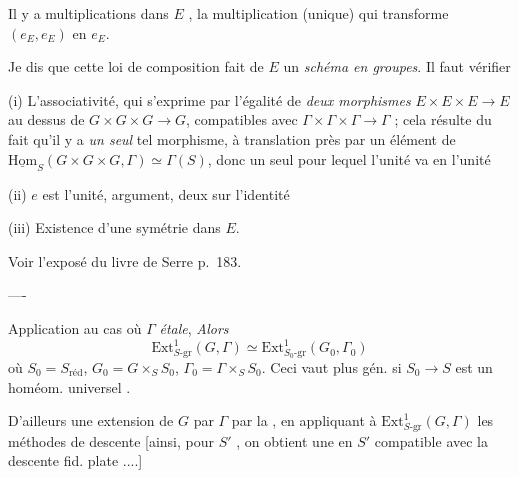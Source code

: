 \documentclass[11pt,a4paper]{article}
\begin{document}
Il y a \ill{} multiplications  dans $E$
\ill{} \ill{} \ill{} \ill{} \ill{} \ill{}, \ill{} la multiplication
\struck{\ill{}} (unique) qui transforme $(e_E, e_E)$ en $e_E$.


Je dis que cette loi de composition fait de $E$ un \emph{schéma en
groupes}. Il faut vérifier

(i) L'associativité, qui s'exprime par l'égalité de \emph{deux morphismes}
$E \times E \times E \to E$ au dessus de $G \times G \times G \to G$,
compatibles avec $\Gamma \times \Gamma \times \Gamma \to \Gamma$ ; cela
résulte du fait qu'il y a \emph{un seul} tel morphisme, à translation près
par un élément de $\underline{\mathrm{Hom}}_S(G \times G \times G, \Gamma)
\simeq \Gamma(S)$, donc un seul pour lequel l'unité va en l'unité

(ii) $e$ est l'unité,  argument, \struck{\ill{}} \ill{}
 deux \ill{} \struck{\ill{}} sur l'identité

(iii) Existence d'une symétrie dans $E$.

Voir l'exposé du livre de Serre \struck{\ill{}} p.\ 183.

----


Application au cas où $\Gamma$ \ill{} \ill{} \emph{étale},
\emph{Alors}
\[
\mathrm{Ext}^1_{S\text{-gr}}(G, \Gamma) \simeq \mathrm{Ext}^1_{S_0\text{-gr}}(G_0, \Gamma_0)
\]
où $S_0 = S_{\mathrm{réd}}$, $G_0 = G \times_S S_0$,
$\Gamma_0 = \Gamma \times_S S_0$. Ceci vaut plus gén. si $S_0 \to S$ est un
homéom. universel . 


D'ailleurs  \ill{} une extension de $G$ par $\Gamma$ \ill{} par
la  \ill{} \ill{}, en appliquant à
$\mathrm{Ext}^1_{S\text{-gr}}(G,\Gamma)$ les méthodes de descente [ainsi,
pour $S'$ \ill{} , on obtient une  en $S'$
compatible avec la descente fid. plate ....]
\end{document}
